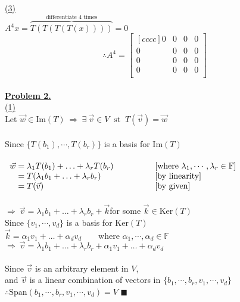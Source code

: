 \documentclass[12pt]{article}
\renewcommand{\qed}{\hfill$\blacksquare$}
\begin{document}
\hyperlink{toc}{\hypertarget{1.3}{(3)}}\\
$\displaystyle A^4x = \overbrace{T(T(T\left( T(x) \right) ))}^{\text{differentiate 4 times}}= 0$\\
\qquad {}
$$\therefore A^4 =\begin{bmatrix}[cccc]
		0 & 0 & 0 & 0 \\
		0 & 0 & 0 & 0 \\
		0 & 0 & 0 & 0 \\
		0 & 0 & 0 & 0 \\
	\end{bmatrix}$$\\

\newpage
{\LARGE \noindent \underline{\textbf{Problem 2.}}}\\

\hyperlink{toc}{\hypertarget{2.1}{(1)}}\\
Let $\vec{w} \in \text{Im}(T) \ \Longrightarrow \ \exists \ \vec{v} \in V \ \text{ st } \ T(\vec{v}) = \vec{w}$
\\\\
Since $\{T(b_1), \cdots , T(b_r)\}$ is a basis for $\text{Im}(T)$
\\\\
$\begin{array}{l@{}>{\displaystyle}ll}
		\vec{w} & {}= \lambda_1T(b_1) + \ldots + \lambda_rT(b_r) \qquad \qquad & \text{[where } \lambda_1, \cdots, \lambda_r \in \mathbb{F}] \\
		        & {}=T(\lambda_1b_1 + \ldots + \lambda_rb_r)                   & \text{[by linearity]}                                       \\
		        & {}=T(\vec{v})                                                & \text{[by given]}                                           \\
	\end{array}$
\\\\
$\Longrightarrow \ \vec{v} = \lambda_1b_1 + \ldots + \lambda_rb_r + \vec{k}$\qquad for some $\vec{k} \in \text{Ker}(T)$\\
Since $\{v_1, \cdots, v_d\}$ is a basis for $\text{Ker}(T)$\\
$\vec{k} = \alpha_1v_1 + \ldots + \alpha_dv_d \qquad \text{where }\alpha_1, \cdots, \alpha_d \in \mathbb{F}$\\
$\Longrightarrow \ \vec{v} = \lambda_1b_1 + \ldots + \lambda_rb_r + \alpha_1v_1 + \ldots + \alpha_dv_d$
\\\\
Since $\vec{v}$ is an arbitrary element in $V$,\\ and $\vec{v}$ is a linear combination of vectors in $\{b_1, \cdots ,b_r,v_1,\cdots ,v_d\}$\\
$\therefore \text{Span}(b_1, \cdots ,b_r,v_1,\cdots ,v_d) = V$ \qed
\end{document}
